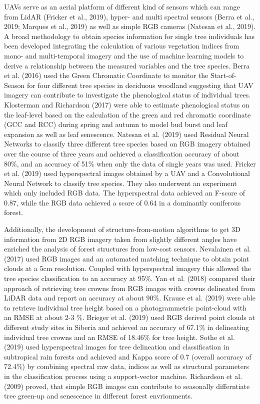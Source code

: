 \documentclass[]{article}
\begin{document}
UAVs serve as an aerial platform of different kind of sensors which can
range from LidAR (Fricker et al., 2019), hyper- and multi spectral
sensors (Berra et al., 2019; Marques et al., 2019) as well as simple RGB
cameras (Natesan et al., 2019). A broad methodology to obtain species
information for single tree individuals has been developed integrating
the calculation of various vegetation indices from mono- and
multi-temporal imagery and the use of machine learning models to derive
a relationship between the measured variables and the tree species.
Berra et al. (2016) used the Green Chromatic Coordinate to monitor the
Start-of-Season for four different tree species in deciduous woodland
suggesting that UAV imagery can contribute to investigate the
phenological status of individual trees. Klosterman and Richardson
(2017) were able to estimate phenological status on the leaf-level based
on the calculation of the green and red chromatic coordinate (GCC and
RCC) during spring and autumn to model bud burst and leaf expansion as
well as leaf senescence. Natesan et al. (2019) used Residual Neural
Networks to classify three different tree species based on RGB imagery
obtained over the course of three years and achieved a classification
accuracy of about 80\%, and an accuracy of 51\% when only the data of
single years was used. Fricker et al. (2019) used hyperspectral images
obtained by a UAV and a Convolutional Neural Network to classify tree
species. They also underwent an experiment which only included RGB data.
The hyperspectral data achieved an F-score of 0.87, while the RGB data
achieved a score of 0.64 in a dominantly coniferous forest.

Additionally, the development of structure-from-motion algorithms to get
3D information from 2D RGB imagery taken from slightly different angles
have enriched the analysis of forest structures from low-cost sensors.
Nevalainen et al. (2017) used RGB images and an automated matching
technique to obtain point clouds at a 5cm resolution. Coupled with
hyperspectral imagery this allowed the tree species classification to an
accuracy at 95\%. Yan et al. (2018) compared their approach of
retrieving tree crowns from RGB images with crowns delineated from LiDAR
data and report an accuracy at about 90\%. Krause et al. (2019) were
able to retrieve individual tree height based on a photogrammetric
point-cloud with an RMSE at about 2-3 \%. Brieger et al. (2019) used RGB
derived point clouds at different study sites in Siberia and achieved an
accuracy of 67.1\% in delineating individual tree crowns and an RMSE of
18.46\% for tree height. Sothe et al. (2019) used hyperspectral images
for tree delineation and classification in subtropical rain forests and
achieved and Kappa score of 0.7 (overall accuracy of 72.4\%) by
combining spectral raw data, indices as well as structural parameters in
the classification process using a support-vector machine. Richardson et
al. (2009) proved, that simple RGB images can contribute to seasonally
differntiate tree green-up and senescence in different forest
envrionments.
\end{document}
